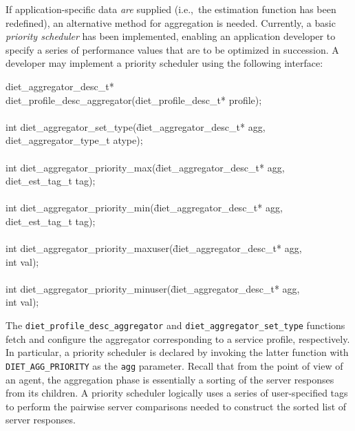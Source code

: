 If application-specific data \emph{are} supplied (i.e.,~the
estimation function has been redefined), an alternative method for
aggregation is needed.  Currently, a basic
\emph{priority scheduler} has been implemented, enabling an
application developer to specify a series of performance values that
are to be optimized in succession.  A developer may implement a
priority scheduler using the following interface:
\begin{code}
\begin{tabbing}
diet\_aggregator\_desc\_t* \\
diet\_profile\_desc\_aggregator(diet\_profile\_desc\_t* profile); \\
\\
int diet\_aggregator\_set\_type(\=diet\_aggregator\_desc\_t* agg, \\
\> diet\_aggregator\_type\_t atype); \\
\\
int diet\_aggregator\_priority\_max(\=diet\_aggregator\_desc\_t* agg, \\
\> diet\_est\_tag\_t tag); \\
\\
int diet\_aggregator\_priority\_min(\=diet\_aggregator\_desc\_t* agg, \\
\> diet\_est\_tag\_t tag); \\
\\
int diet\_aggregator\_priority\_maxuser(\=diet\_aggregator\_desc\_t* agg, \\
\> int val); \\
\\
int diet\_aggregator\_priority\_minuser(\=diet\_aggregator\_desc\_t* agg, \\
\> int val); \\
\end{tabbing}
\end{code}
The \texttt{diet\_profile\_desc\_aggregator} and
\texttt{diet\_aggregator\_set\_type} functions fetch and configure the
aggregator corresponding to a \diet service profile, respectively.
In particular, a priority scheduler is declared by invoking the latter
function with \texttt{DIET\_AGG\_PRIORITY} as the \texttt{agg}
parameter.
Recall that from the point of view of an agent, the aggregation phase
is essentially a sorting of the server responses from its children.
A priority scheduler logically uses a series of user-specified tags to
perform the pairwise server comparisons needed to construct the
sorted list of server responses.

